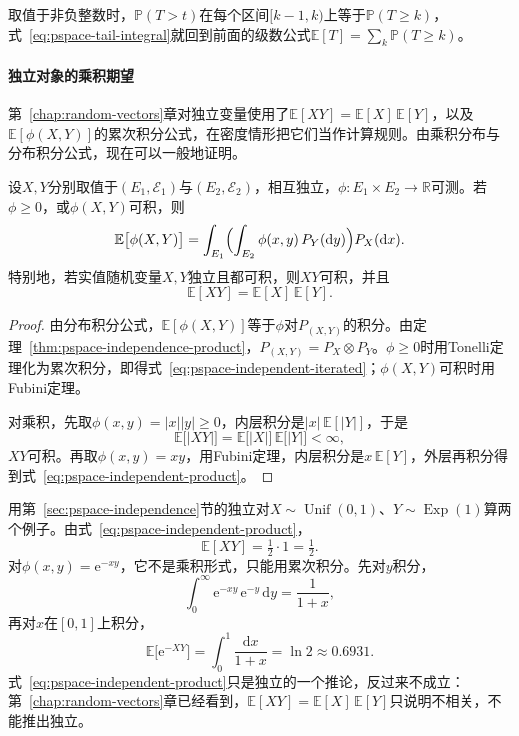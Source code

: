 取值于非负整数时，$\mathbb{P}(T>t)$在每个区间$[k-1,k)$上等于$\mathbb{P}(T\geq k)$，式~\eqref{eq:pspace-tail-integral}就回到前面的级数公式$\mathbb{E}[T]=\sum_k\mathbb{P}(T\geq k)$。

\paragraph{独立对象的乘积期望}
第~\ref{chap:random-vectors}章对独立变量使用了$\mathbb{E}[XY]=\mathbb{E}[X]\,\mathbb{E}[Y]$，以及$\mathbb{E}[\phi(X,Y)]$的累次积分公式，在密度情形把它们当作计算规则。由乘积分布与分布积分公式，现在可以一般地证明。

\begin{theorem}[独立对象的期望]
\label{thm:pspace-independent-expectation}
设$X,Y$分别取值于$(E_1,\mathcal{E}_1)$与$(E_2,\mathcal{E}_2)$，相互独立，$\phi:E_1\times E_2\to\mathbb{R}$可测。若$\phi\geq0$，或$\phi(X,Y)$可积，则
\begin{equation}
  \mathbb{E}\bigl[\phi(X,Y)\bigr]=\int_{E_1}\Bigl(\int_{E_2}\phi(x,y)\,P_Y(\mathrm{d}y)\Bigr)P_X(\mathrm{d}x).
  \label{eq:pspace-independent-iterated}
\end{equation}
特别地，若实值随机变量$X,Y$独立且都可积，则$XY$可积，并且
\begin{equation}
  \mathbb{E}[XY]=\mathbb{E}[X]\,\mathbb{E}[Y].
  \label{eq:pspace-independent-product}
\end{equation}
\end{theorem}

\begin{proof}
由分布积分公式，$\mathbb{E}[\phi(X,Y)]$等于$\phi$对$P_{(X,Y)}$的积分。由定理~\ref{thm:pspace-independence-product}，$P_{(X,Y)}=P_X\otimes P_Y$。$\phi\geq0$时用Tonelli定理化为累次积分，即得式~\eqref{eq:pspace-independent-iterated}；$\phi(X,Y)$可积时用Fubini定理。

对乘积，先取$\phi(x,y)=\lvert x\rvert\lvert y\rvert\geq0$，内层积分是$\lvert x\rvert\,\mathbb{E}[\lvert Y\rvert]$，于是
\[
  \mathbb{E}\bigl[\lvert XY\rvert\bigr]=\mathbb{E}\bigl[\lvert X\rvert\bigr]\,\mathbb{E}\bigl[\lvert Y\rvert\bigr]<\infty,
\]
$XY$可积。再取$\phi(x,y)=xy$，用Fubini定理，内层积分是$x\,\mathbb{E}[Y]$，外层再积分得到式~\eqref{eq:pspace-independent-product}。
\end{proof}

用第~\ref{sec:pspace-independence}节的独立对$X\sim\operatorname{Unif}(0,1)$、$Y\sim\operatorname{Exp}(1)$算两个例子。由式~\eqref{eq:pspace-independent-product}，
\[
  \mathbb{E}[XY]=\tfrac12\cdot1=\tfrac12 .
\]
对$\phi(x,y)=\mathrm{e}^{-xy}$，它不是乘积形式，只能用累次积分。先对$y$积分，
\[
  \int_0^{\infty}\mathrm{e}^{-xy}\,\mathrm{e}^{-y}\,\mathrm{d}y=\frac{1}{1+x},
\]
再对$x$在$[0,1]$上积分，
\[
  \mathbb{E}\bigl[\mathrm{e}^{-XY}\bigr]=\int_0^1\frac{\mathrm{d}x}{1+x}=\ln2\approx0.6931 .
\]
式~\eqref{eq:pspace-independent-product}只是独立的一个推论，反过来不成立：第~\ref{chap:random-vectors}章已经看到，$\mathbb{E}[XY]=\mathbb{E}[X]\,\mathbb{E}[Y]$只说明不相关，不能推出独立。

